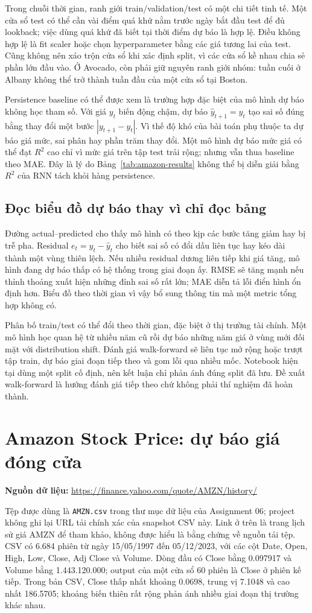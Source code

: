 \documentclass[12pt,a4paper]{report}
\newcommand{\datasetlink}[1]{\par\noindent\textbf{Nguồn dữ liệu: }\url{#1}\par}
\begin{document}
Trong chuỗi thời gian, ranh giới train/validation/test có một chi tiết tinh tế. Một cửa sổ test có thể cần vài điểm quá khứ nằm trước ngày bắt đầu test để đủ lookback; việc dùng quá khứ đã biết tại thời điểm dự báo là hợp lệ. Điều không hợp lệ là fit scaler hoặc chọn hyperparameter bằng các giá tương lai của test. Cũng không nên xáo trộn cửa sổ khi xác định split, vì các cửa sổ kề nhau chia sẻ phần lớn đầu vào. Ở Avocado, còn phải giữ nguyên ranh giới nhóm: tuần cuối ở Albany không thể trở thành tuần đầu của một cửa sổ tại Boston.

Persistence baseline có thể được xem là trường hợp đặc biệt của mô hình dự báo không học tham số. Với giá $y_t$ biến động chậm, dự báo $\hat y_{t+1}=y_t$ tạo sai số đúng bằng thay đổi một bước $|y_{t+1}-y_t|$. Vì thế độ khó của bài toán phụ thuộc ta dự báo giá mức, sai phân hay phần trăm thay đổi. Một mô hình dự báo mức giá có thể đạt $R^2$ cao chỉ vì mức giá trên tập test trải rộng; nhưng vẫn thua baseline theo MAE. Đây là lý do Bảng~\ref{tab:amazon-results} không thể bị diễn giải bằng $R^2$ của RNN tách khỏi hàng persistence.

\subsection{Đọc biểu đồ dự báo thay vì chỉ đọc bảng}
Đường actual--predicted cho thấy mô hình có theo kịp các bước tăng giảm hay bị trễ pha. Residual $e_t=y_t-\hat y_t$ cho biết sai số có đổi dấu liên tục hay kéo dài thành một vùng thiên lệch. Nếu nhiều residual dương liên tiếp khi giá tăng, mô hình đang dự báo thấp có hệ thống trong giai đoạn ấy. RMSE sẽ tăng mạnh nếu thỉnh thoảng xuất hiện những đỉnh sai số rất lớn; MAE diễn tả lỗi điển hình ổn định hơn. Biểu đồ theo thời gian vì vậy bổ sung thông tin mà một metric tổng hợp không có.

Phân bố train/test có thể đổi theo thời gian, đặc biệt ở thị trường tài chính. Một mô hình học quan hệ từ nhiều năm cũ rồi dự báo những năm giá ở vùng mới đối mặt với distribution shift. Đánh giá walk-forward sẽ liên tục mở rộng hoặc trượt tập train, dự báo giai đoạn tiếp theo và gom lỗi qua nhiều mốc. Notebook hiện tại dùng một split cố định, nên kết luận chỉ phản ánh đúng split đã lưu. Đề xuất walk-forward là hướng đánh giá tiếp theo chứ không phải thí nghiệm đã hoàn thành.

\section{Amazon Stock Price: dự báo giá đóng cửa}
\datasetlink{https://finance.yahoo.com/quote/AMZN/history/}
Tệp được dùng là \texttt{AMZN.csv} trong thư mục dữ liệu của Assignment 06; project không ghi lại URL tải chính xác của snapshot CSV này. Link ở trên là trang lịch sử giá AMZN để tham khảo, không được hiểu là bằng chứng về nguồn tải tệp. CSV có 6.684 phiên từ ngày 15/05/1997 đến 05/12/2023, với các cột Date, Open, High, Low, Close, Adj Close và Volume. Dòng đầu có Close bằng 0.097917 và Volume bằng 1.443.120.000; output của một cửa sổ 60 phiên là Close ở phiên kế tiếp. Trong bản CSV, Close thấp nhất khoảng 0.0698, trung vị 7.1048 và cao nhất 186.5705; khoảng biến thiên rất rộng phản ánh nhiều giai đoạn thị trường khác nhau.
\end{document}
